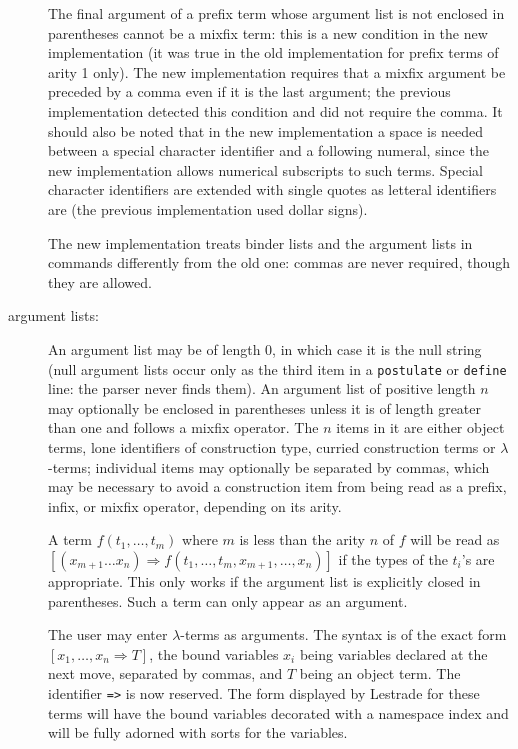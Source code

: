 \documentclass[12pt]{article}
\begin{document}
\begin{description}
The final argument of a prefix term whose argument list is not enclosed in parentheses cannot be a mixfix term:  this is a new condition in the new implementation (it was true in the old implementation for prefix terms of arity 1 only).  The new implementation requires that a mixfix argument be preceded by a comma even if it is the last argument;  the previous implementation detected this condition and did not require the comma.  It should also be noted that in the new implementation a space is needed between a special character identifier and a following numeral, since the new implementation allows numerical subscripts to such terms.  Special character identifiers are extended with single quotes as letteral identifiers are (the previous implementation used dollar signs).

The new implementation treats binder lists and the argument lists in commands differently from the old one: commas are never required, though they are allowed.

\item[argument lists:]  An argument list may be of length 0, in which case it is the null string (null argument lists occur only as the third item in a {\tt postulate} or {\tt define} line:  the parser never finds them).  An argument list of positive length $n$ may optionally be enclosed in parentheses unless it is of length greater than one and follows a mixfix operator.  The $n$  items in it are either object terms, lone identifiers of construction type, curried construction terms or $\lambda$-terms;  individual items may optionally be separated by commas, which may be necessary to avoid a construction item from being read as a prefix, infix, or mixfix operator, depending on its arity.  

A term $f(t_1,\ldots,t_m)$ where $m$ is less than the arity $n$ of $f$ will be read as $[(x_{m+1}\ldots x_n) \Rightarrow f(t_1,\ldots,t_m,x_{m+1},\dots,x_n)]$ if the types of the $t_i$'s are appropriate.  This only works if the argument list is explicitly closed in parentheses.    Such a term can only appear as an argument.

The user may enter $\lambda$-terms as arguments.  The syntax is of the exact form $[x_1,\ldots,x_n \Rightarrow T]$, the bound variables $x_i$ being variables declared at the next move, separated by commas, and $T$ being an object term.  The identifier {\tt =>} is now reserved.  The form displayed by Lestrade for these terms will have the bound variables decorated with a namespace index and will be fully adorned with sorts for the variables.


\end{description}
\end{document}
